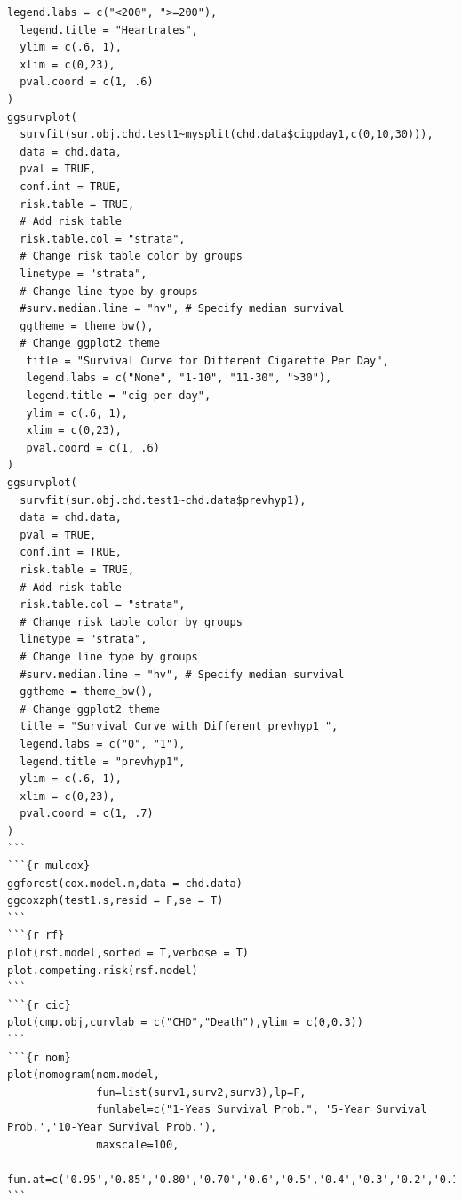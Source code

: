 \documentclass[lang=cn,11pt,a4paper,cite=super,AutoFakeBold]{elegantpaper}
\begin{document}
\begin{lstlisting}[style=R]
  legend.labs = c("<200", ">=200"),
  legend.title = "Heartrates",
  ylim = c(.6, 1),
  xlim = c(0,23),
  pval.coord = c(1, .6)
)
ggsurvplot(
  survfit(sur.obj.chd.test1~mysplit(chd.data$cigpday1,c(0,10,30))),
  data = chd.data,
  pval = TRUE,
  conf.int = TRUE,
  risk.table = TRUE,
  # Add risk table
  risk.table.col = "strata",
  # Change risk table color by groups
  linetype = "strata",
  # Change line type by groups
  #surv.median.line = "hv", # Specify median survival
  ggtheme = theme_bw(),
  # Change ggplot2 theme
   title = "Survival Curve for Different Cigarette Per Day",
   legend.labs = c("None", "1-10", "11-30", ">30"),
   legend.title = "cig per day",
   ylim = c(.6, 1),
   xlim = c(0,23),
   pval.coord = c(1, .6)
)
ggsurvplot(
  survfit(sur.obj.chd.test1~chd.data$prevhyp1),
  data = chd.data,
  pval = TRUE,
  conf.int = TRUE,
  risk.table = TRUE,
  # Add risk table
  risk.table.col = "strata",
  # Change risk table color by groups
  linetype = "strata",
  # Change line type by groups
  #surv.median.line = "hv", # Specify median survival
  ggtheme = theme_bw(),
  # Change ggplot2 theme
  title = "Survival Curve with Different prevhyp1 ",
  legend.labs = c("0", "1"),
  legend.title = "prevhyp1",
  ylim = c(.6, 1),
  xlim = c(0,23),
  pval.coord = c(1, .7)
)
```
```{r mulcox}
ggforest(cox.model.m,data = chd.data)
ggcoxzph(test1.s,resid = F,se = T)
```
```{r rf}
plot(rsf.model,sorted = T,verbose = T)
plot.competing.risk(rsf.model)
```
```{r cic}
plot(cmp.obj,curvlab = c("CHD","Death"),ylim = c(0,0.3))
```
```{r nom}
plot(nomogram(nom.model,
              fun=list(surv1,surv2,surv3),lp=F,
              funlabel=c("1-Yeas Survival Prob.", '5-Year Survival Prob.','10-Year Survival Prob.'),
              maxscale=100,
              fun.at=c('0.95','0.85','0.80','0.70','0.6','0.5','0.4','0.3','0.2','0.1')))
```
\end{lstlisting}
\end{document}
